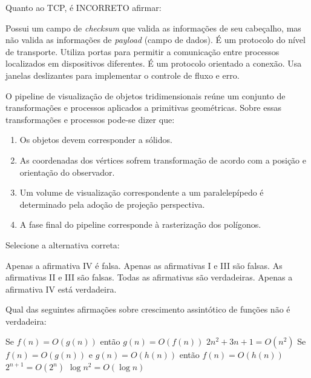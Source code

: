 \documentclass[12pt, addpoints]{exam}
\begin{document}
\begin{questions}
\question

Quanto ao TCP, é INCORRETO afirmar:
\begin{choices}
\choice Possui um campo de \textit{checksum} que valida as informações de seu cabeçalho, mas não valida as informações de \textit{payload} (campo de dados).
\choice É um protocolo do nível de transporte.
\choice Utiliza portas para permitir a comunicação entre processos localizados em dispositivos diferentes.
\choice É um protocolo orientado a conexão.
\choice Usa janelas deslizantes para implementar o controle de fluxo e erro.
\end{choices}

\question

O pipeline de visualização de objetos tridimensionais reúne um conjunto de transformações e processos aplicados a primitivas geométricas. Sobre essas transformações e processos pode-se dizer que:

\begin{enumerate}[label=\Roman*.]

    \item Os objetos devem corresponder a sólidos.

    \item As coordenadas dos vértices sofrem transformação de acordo com a posição e orientação do observador.

    \item Um volume de visualização correspondente a um paralelepípedo é determinado pela adoção de projeção perspectiva.

    \item A fase final do pipeline corresponde à rasterização dos polígonos.

\end{enumerate}

Selecione a alternativa correta:
\begin{choices}
\choice Apenas a afirmativa IV é falsa.
\choice Apenas as afirmativas I e III são falsas.
\choice As afirmativas II e III são falsas.
\choice Todas as afirmativas são verdadeiras.
\choice Apenas a afirmativa IV está verdadeira.
\end{choices}

\question

Qual das seguintes afirmações sobre crescimento assintótico de funções não é verdadeira:
\begin{choices}
\choice Se \( f(n) = O(g(n)) \) então \( g(n) = O(f(n)) \)
\choice \( 2n^2 + 3n + 1 = O(n^2) \)
\choice Se \( f(n) = O(g(n)) \) e \( g(n) = O(h(n)) \) então \( f(n) = O(h(n)) \)
\choice \( 2^{n+1} = O(2^n) \)
\choice \( \log n^2 = O(\log n) \)
\end{choices}


\end{questions}
\end{document}
